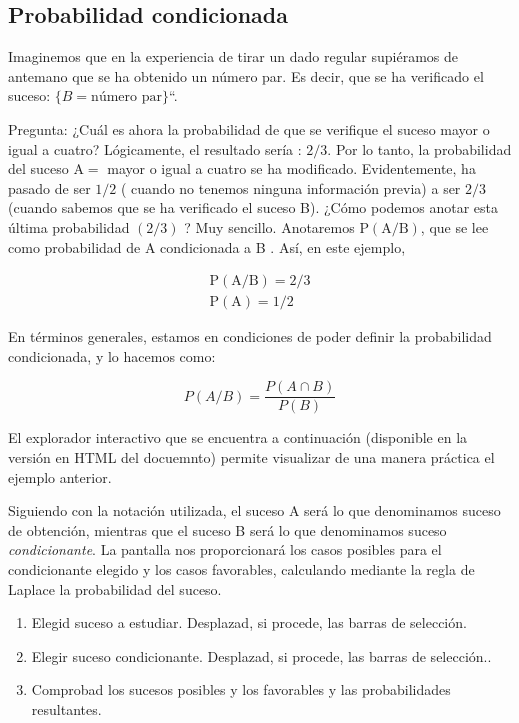 \documentclass[
]{article}
\providecommand{\tightlist}{%
  \setlength{\itemsep}{0pt}\setlength{\parskip}{0pt}}
\begin{document}
\subsection{Probabilidad condicionada}\label{probabilidad-condicionada}

Imaginemos que en la experiencia de tirar un dado regular supiéramos de
antemano que se ha obtenido un número par. Es decir, que se ha
verificado el suceso: \(\{B = \mbox{número par}\}\)``.

Pregunta: ¿Cuál es ahora la probabilidad de que se verifique el suceso
mayor o igual a cuatro? Lógicamente, el resultado sería : \(2 / 3\). Por
lo tanto, la probabilidad del suceso \(\mathrm{A}=\) mayor o igual a
cuatro se ha modificado. Evidentemente, ha pasado de ser \(1 / 2\) (
cuando no tenemos ninguna información previa) a ser \(2 / 3\) (cuando
sabemos que se ha verificado el suceso B). ¿Cómo podemos anotar esta
última probabilidad \((2 / 3)\) ? Muy sencillo. Anotaremos
\(\mathrm{P}(\mathrm{A} / \mathrm{B})\), que se lee como probabilidad de A
condicionada a B . Así, en este ejemplo,

\[
\begin{gathered}
\mathrm{P}(\mathrm{A} / \mathrm{B})=2 / 3 \\
\mathrm{P}(\mathrm{A})=1 / 2
\end{gathered}
\]

En términos generales, estamos en condiciones de poder definir la
probabilidad condicionada, y lo hacemos como:

\[
P(A / B)=\frac{P(A \cap B)}{P(B)}
\]

El explorador interactivo que se encuentra a continuación (disponible en la versión en HTML del docuemnto) permite visualizar de una manera práctica el ejemplo
anterior.

Siguiendo con la notación utilizada, el suceso A será lo que
denominamos suceso de obtención, mientras que el suceso B será lo que
denominamos suceso \emph{condicionante}. La pantalla nos proporcionará los casos
posibles para el condicionante elegido y los casos favorables,
calculando mediante la regla de Laplace la probabilidad del suceso.

\begin{enumerate}
\def\labelenumi{\arabic{enumi})}
\tightlist
\item
  Elegid suceso a estudiar. Desplazad, si procede, las barras de selección.
\item
  Elegir suceso condicionante. Desplazad, si procede, las barras de selección..
\item
  Comprobad los sucesos posibles y los favorables y las probabilidades resultantes.
\end{enumerate}
\end{document}
